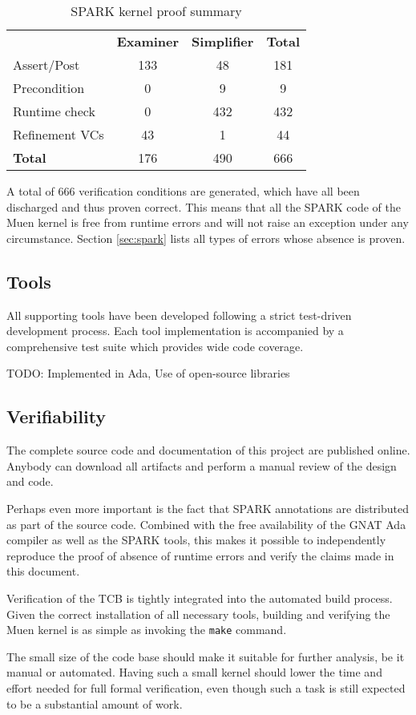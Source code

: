 \begin{table}[h]
	\centering
	\begin{tabular}{l c c c}
		& \textbf{Examiner} & \textbf{Simplifier} & \textbf{Total} \\
		Assert/Post    & 133 & 48  & 181 \\
		Precondition   & 0   & 9   & 9   \\
		Runtime check  & 0   & 432 & 432 \\
		Refinement VCs & 43  & 1   & 44 \\
		\hline
		\textbf{Total} & 176 & 490 & 666 \\
	\end{tabular}
	\caption{SPARK kernel proof summary}
	\label{tab:kernel-proof-sum}
\end{table}

A total of 666 verification conditions are generated, which have all been
discharged and thus proven correct. This means that all the SPARK code of the
Muen kernel is free from runtime errors and will not raise an exception under
any circumstance. Section \ref{sec:spark} lists all types of errors whose
absence is proven.

\subsection{Tools}
All supporting tools have been developed following a strict test-driven
development process. Each tool implementation is accompanied by a comprehensive
test suite which provides wide code coverage.

TODO: Implemented in Ada, Use of open-source libraries

\subsection{Verifiability}
The complete source code and documentation of this project are published online.
Anybody can download all artifacts and perform a manual review of the design and
code.

Perhaps even more important is the fact that SPARK annotations are distributed
as part of the source code. Combined with the free availability of the GNAT Ada
compiler as well as the SPARK tools, this makes it possible to independently
reproduce the proof of absence of runtime errors and verify the claims made in
this document.

Verification of the TCB is tightly integrated into the automated build process.
Given the correct installation of all necessary tools, building and verifying
the Muen kernel is as simple as invoking the \texttt{make} command.

The small size of the code base should make it suitable for further analysis, be
it manual or automated. Having such a small kernel should lower the time and
effort needed for full formal verification, even though such a task is still
expected to be a substantial amount of work.

